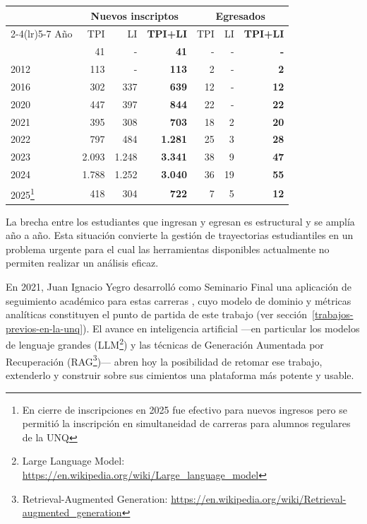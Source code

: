 \documentclass[
  spanish,
]{article}
\newcounter{none} %
\begin{document}
\label{tab:ni-egresados}
{\def\LTcaptype{none} %
\begin{longtable}[]{@{}lrrrrrr@{}}
\toprule\noalign{}
& \multicolumn{3}{c}{Nuevos inscriptos} & \multicolumn{3}{c}{Egresados} \\
\cmidrule(lr){2-4}\cmidrule(lr){5-7}
Año & TPI & LI & \textbf{TPI+LI} & TPI & LI & \textbf{TPI+LI} \\
\midrule\noalign{}
\endhead
\bottomrule\noalign{}
\endlastfoot
2007 &   41  &     - &    \textbf{41} &  - &  - &  \textbf{-} \\
2012 &   113 &     - &   \textbf{113} &  2 &  - &  \textbf{2} \\
2016 &   302 &   337 &   \textbf{639} & 12 &  - & \textbf{12} \\
2020 &   447 &   397 &   \textbf{844} & 22 &  - & \textbf{22} \\
2021 &   395 &   308 &   \textbf{703} & 18 &  2 & \textbf{20} \\
2022 &   797 &   484 & \textbf{1.281} & 25 &  3 & \textbf{28} \\
2023 & 2.093 & 1.248 & \textbf{3.341} & 38 &  9 & \textbf{47} \\
2024 & 1.788 & 1.252 & \textbf{3.040} & 36 & 19 & \textbf{55} \\
2025\footnote{En cierre de inscripciones en 2025 fue efectivo para nuevos ingresos pero se permitió la inscripción en simultaneidad de carreras para alumnos regulares de la UNQ} &   418 &   304 &   \textbf{722} &  7 &  5 & \textbf{12} \\
\end{longtable}
}

La brecha entre los estudiantes que ingresan y egresan es estructural
y se amplía año a año. Esta situación convierte la gestión de trayectorias
estudiantiles en un problema urgente para el cual las herramientas
disponibles actualmente no permiten realizar un análisis eficaz.

En 2021, Juan Ignacio Yegro desarrolló como Seminario Final una aplicación
de seguimiento académico para estas carreras \citep{yegro2021}, cuyo modelo
de dominio y métricas analíticas constituyen el punto de partida de este trabajo
(ver sección~\ref{trabajos-previos-en-la-unq}). El avance en
inteligencia artificial ---en particular los modelos de lenguaje grandes
(LLM\footnote{Large Language Model: \url{https://en.wikipedia.org/wiki/Large_language_model}})
y las técnicas de Generación Aumentada por Recuperación
(RAG\footnote{Retrieval-Augmented Generation: \url{https://en.wikipedia.org/wiki/Retrieval-augmented_generation}})---
abren hoy la posibilidad de retomar ese trabajo, extenderlo y construir sobre
sus cimientos una plataforma más potente y usable.
\end{document}
